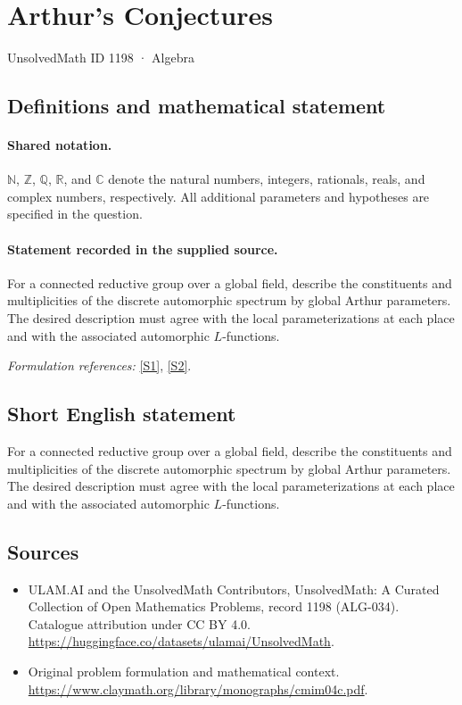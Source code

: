 \documentclass[11pt]{article}
\newcommand{\sref}[2]{\hyperlink{source:#1:#2}{[S#2]}}
\begin{document}
\setcounter{section}{1197}
\section{Arthur's Conjectures}\label{1198}
{\small UnsolvedMath ID 1198 · Algebra}
\subsection{Definitions and mathematical statement}

\paragraph{Shared notation.}$\mathbb N$, $\mathbb Z$, $\mathbb Q$, $\mathbb R$, and $\mathbb C$ denote the natural numbers, integers, rationals, reals, and complex numbers, respectively. All additional parameters and hypotheses are specified in the question.


\paragraph{Statement recorded in the supplied source.}
For a connected reductive group over a global field, describe the constituents and multiplicities of the discrete automorphic spectrum by global Arthur parameters. The desired description must agree with the local parameterizations at each place and with the associated automorphic $L$-functions.
\par\smallskip\textit{Formulation references:} \sref{1198}{1}, \sref{1198}{2}.
\subsection{Short English statement}
For a connected reductive group over a global field, describe the constituents and multiplicities of the discrete automorphic spectrum by global Arthur parameters. The desired description must agree with the local parameterizations at each place and with the associated automorphic $L$-functions.
\subsection{Sources}
\begin{itemize}
\item[\hypertarget{source:1198:1}{S1}] ULAM.AI and the UnsolvedMath Contributors, UnsolvedMath: A Curated Collection of Open Mathematics Problems, record 1198 (ALG-034). Catalogue attribution under CC BY 4.0.
\url{https://huggingface.co/datasets/ulamai/UnsolvedMath}.
\item[\hypertarget{source:1198:2}{S2}] Original problem formulation and mathematical context.
\url{https://www.claymath.org/library/monographs/cmim04c.pdf}.
\end{itemize}
\label{end:1198}
\end{document}
